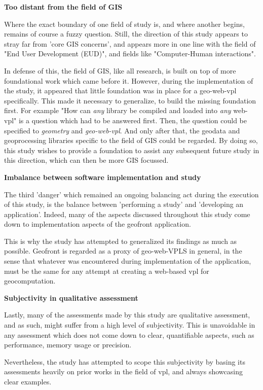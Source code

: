 \textbf{Too distant from the field of GIS}

Where the exact boundary of one field of study is, and where another begins, remains of course a fuzzy question. 
Still, the direction of this study appears to stray far from 'core GIS concerns', and appears more in one line with the  field of "End User Development (EUD)", and fields like "Computer-Human interactions". 

In defense of this, the field of GIS, like all research, is built on top of more foundational work which came before it. 
However, during the implementation of the study, it appeared that little foundation was in place for a geo-web-vpl specifically. 
This made it necessary to generalize, to build the missing foundation first.
For example "How can \emph{any} library be compiled and loaded into \emph{any} web-vpl" is a question which had to be answered first. 
Then, the question could be specified to \emph{geometry} and \emph{geo-web-vpl}. 
And only after that, the geodata and geoprocessing libraries specific to the field of GIS could be regarded. 
By doing so, this study wishes to provide a foundation to assist any subsequent future study in this direction, which can then be more GIS focussed.

\textbf{Imbalance between software implementation and study}

The third 'danger' which remained an ongoing balancing act during the execution of this study, is the balance between 'performing a study' and 'developing an application'. 
Indeed, many of the aspects discussed throughout this study come down to implementation aspects of the geofront application. 

This is why the study has attempted to generalized its findings as much as possible.
Geofront is regarded as a proxy of geo-web-VPLS in general, in the sense that whatever was encountered during implementation of the application, must be the same for any attempt at creating a web-based vpl for geocomputation.


\textbf{Subjectivity in qualitative assessment}

Lastly, many of the assessments made by this study are qualitative assessment, and as such, might suffer from a high level of subjectivity. 
This is unavoidable in any assessment which does not come down to clear, quantifiable aspects, such as performance, memory usage or precision. 

Nevertheless, the study has attempted to scope this subjectivity by basing its assessments heavily on prior works in the field of vpl, and always showcasing clear examples. 


